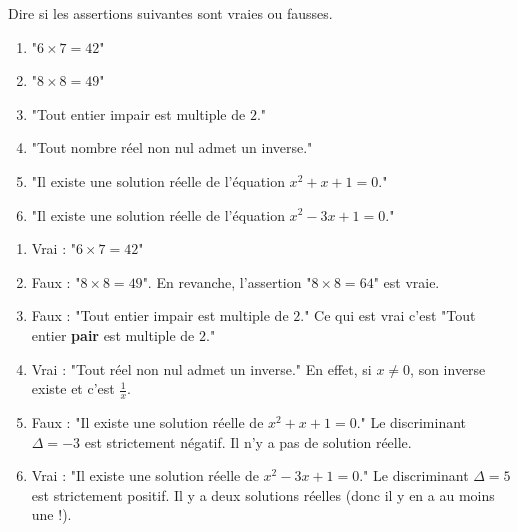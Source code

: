 \documentclass[11pt,class=report,crop=false]{standalone}
\begin{document}


\bigskip
\bigskip



\exercice{}
\enonce
Dire si les assertions suivantes sont vraies ou fausses.
 \begin{enumerate}
      \item "$6\times 7 = 42$"
      \item "$8 \times 8 = 49$"
      \item "Tout entier impair est multiple de $2$."
      \item "Tout nombre réel non nul admet un inverse."
      \item "Il existe une solution réelle de l'équation $x^2+x+1=0$."
      \item "Il existe une solution réelle de l'équation $x^2-3x+1=0$." 
\end{enumerate} 
\finenonce

\noindication

\correction
\sauteligne
 \begin{enumerate}
     
    \item Vrai : "$6\times 7 = 42$"
    
    \item Faux : "$8 \times 8 = 49$". En revanche, l'assertion "$8 \times 8 = 64$" est vraie.
    
    \item Faux : "Tout entier impair est multiple de $2$." Ce qui est vrai c'est "Tout entier \textbf{pair} est multiple de $2$."
    
    \item Vrai : "Tout réel non nul admet un inverse." En effet, si $x \neq 0$, son inverse existe et c'est $\frac1x$.
    
    \item Faux : "Il existe une solution réelle de $x^2+x+1=0$." Le discriminant $\Delta = -3$ est strictement négatif. Il n'y a pas de solution réelle.
    
    \item Vrai : "Il existe une solution réelle de $x^2-3x+1=0$." Le discriminant $\Delta = 5$ est strictement positif. Il y a deux solutions réelles (donc il y en a au moins une !).
    
\end{enumerate} 
\fincorrection
\finexercice
\end{document}
